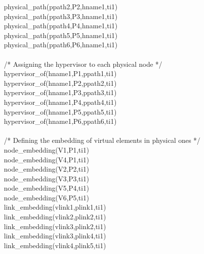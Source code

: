 \begin{myformula}
physical\_path(ppath2,P2,hname1,ti1)\\
physical\_path(ppath3,P3,hname1,ti1)\\
physical\_path(ppath4,P4,hname1,ti1)\\
physical\_path(ppath5,P5,hname1,ti1)\\
physical\_path(ppath6,P6,hname1,ti1)\\
\textbf{\\}
/* Assigning the hypervisor to each physical node */\\
hypervisor\_of(hname1,P1,ppath1,ti1)\\
hypervisor\_of(hname1,P2,ppath2,ti1)\\
hypervisor\_of(hname1,P3,ppath3,ti1)\\
hypervisor\_of(hname1,P4,ppath4,ti1)\\
hypervisor\_of(hname1,P5,ppath5,ti1)\\
hypervisor\_of(hname1,P6,ppath6,ti1)\\
\textbf{\\}
/* Defining the embedding of virtual elements in physical ones */\\
node\_embedding(V1,P1,ti1)\\
node\_embedding(V4,P1,ti1)\\
node\_embedding(V2,P2,ti1)\\
node\_embedding(V3,P3,ti1)\\
node\_embedding(V5,P4,ti1)\\
node\_embedding(V6,P5,ti1)\\
link\_embedding(vlink1,plink1,ti1)\\
link\_embedding(vlink2,plink2,ti1)\\
link\_embedding(vlink3,plink2,ti1)\\
link\_embedding(vlink3,plink4,ti1)\\
link\_embedding(vlink4,plink5,ti1)
\end{myformula}